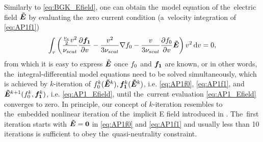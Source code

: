 Similarly to \eqref{eq:BGK_Efield}, one can obtain the~model equation of 
the~electric field $\boldsymbol{\tilde{E}}$ by evaluating the~zero current condition 
(a~velocity integration of \eqref{eq:AP1f1})
\begin{equation}
  \int_{v} \left(\frac{\frac{\nu_{e}}{2}v^2}{\nu_{scat}}
  \frac{\partial{\boldsymbol{f_1}}}{\partial{v}} 
  - \frac{v^2}{3\nu_{scat}}
  \nabla f_0 
  - \frac{v}{3\nu_{scat}}\frac{\partial{f_0}}{\partial{v}}\boldsymbol{\tilde{E}}
  \right) v^2\, \text{d}v = 0 ,
  \label{eq:AP1_Efield}
\end{equation}
from which it is easy to express $\boldsymbol{\tilde{E}}$ once $f_0$ and $\boldsymbol{f_1}$ are known, or
in other words, the~integral-differential model equations need to be solved 
simultaneously, which is achieved by $k$-iteration of 
$f_0^k(\boldsymbol{\tilde{E}}^k), \boldsymbol{f_1}^k(\boldsymbol{\tilde{E}}^k)$, i.e. \eqref{eq:AP1f0}, \eqref{eq:AP1f1}, and 
$\boldsymbol{\tilde{E}}^{k+1}(f_0^k, \boldsymbol{f_1}^k)$, i.e.  \eqref{eq:AP1_Efield}, until 
the~current evaluation \eqref{eq:AP1_Efield} converges to zero. In principle,
our concept of $k$-iteration resembles to the~embedded nonlinear iteration
of the~implicit E field introduced in \cite{Kingham_JCP2004}.
The~first iteration starts with $\boldsymbol{\tilde{E}}=\boldsymbol{0}$ in \eqref{eq:AP1f0} and 
\eqref{eq:AP1f1} and usually less than 10 iterations is sufficient to obey
the~quasi-neutrality constraint.

